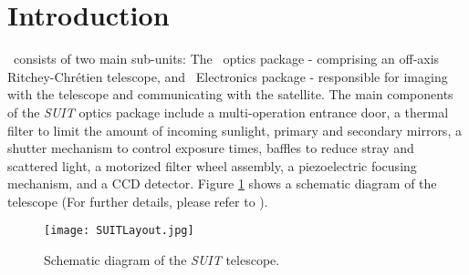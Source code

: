 \justifying

\section{Introduction}\label{secc3_intro}

\suit~consists of two main sub-units: The \suit~optics package - comprising an off-axis Ritchey-Chr\'{e}tien telescope, and \suit~Electronics package - responsible for imaging with the telescope and communicating with the satellite. The main components of the \textit{SUIT} optics package include a multi-operation entrance door, a thermal filter to limit the amount of incoming sunlight, primary and secondary mirrors, a shutter mechanism to control exposure times, baffles to reduce stray and scattered light, a motorized filter wheel assembly, a piezoelectric focusing mechanism, and a CCD detector. Figure \ref{fig:suit} shows a schematic diagram of the telescope (For further details, please refer to \cite{suit_main}).

\begin{figure}[ht!]
    \centering
    \texttt{[image: SUITLayout.jpg]}
    \caption{Schematic diagram of the \textit{SUIT} telescope.}
    \label{fig:suit}
\end{figure}

